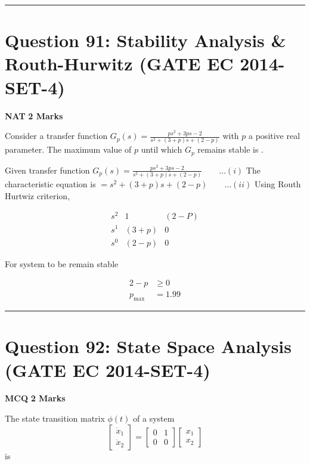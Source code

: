 \documentclass[11pt,a4paper]{article}
\begin{document}
\vspace{1.5em}
\hrule
\vspace{1.5em}

\section*{Question 91: Stability Analysis \& Routh-Hurwitz (GATE EC 2014-SET-4)}
\noindent \textbf{\color{primary}NAT} \hfill \textbf{\color{secondary}2 Marks}


\noindent Consider a transfer function $G_{p}(s)=\frac{ps^{2}+3ps-2}{s^{2}+(3+p)s+(2-p)}$ with $p$ a positive real parameter. The maximum value of $p$ until which $G_{p}$ remains stable is \underline{\hspace{1.5cm}}.


\begin{tcolorbox}[solbox, title=Detailed Solution -- Question 91]
Given transfer function
$G_{p}(s)=\frac{p s^{2}+3 p s-2}{s^{2}+(3+p) s+(2-p)} \qquad\ldots(i)$
 The characteristic equation is
$=s^{2}+(3+p) s+(2-p)\qquad\ldots(ii)$
 Using Routh Hurtwiz criterion,

\[
\begin{array}{l|ll} s^{2} & 1 & (2-P) \\ s^{1} & (3+p) & 0 \\ s^{0} & (2-p) & 0 \end{array}
\]

 For system to be remain stable

\[
\begin{aligned} 2-p & \geq 0 \\ p_{\max } &=1.99 \end{aligned}
\]
\end{tcolorbox}

\vspace{1.5em}
\hrule
\vspace{1.5em}

\section*{Question 92: State Space Analysis (GATE EC 2014-SET-4)}
\noindent \textbf{\color{primary}MCQ} \hfill \textbf{\color{secondary}2 Marks}


\noindent The state transition matrix $\phi (t)$ of a system 
\[
\begin{bmatrix} \dot{x}_{1}\\ \dot{x}_{2} \end{bmatrix}=\begin{bmatrix} 0 & 1\\ 0&0 \end{bmatrix}\begin{bmatrix} x_{1}\\ x_{2} \end{bmatrix}
\]
 is
\end{document}
